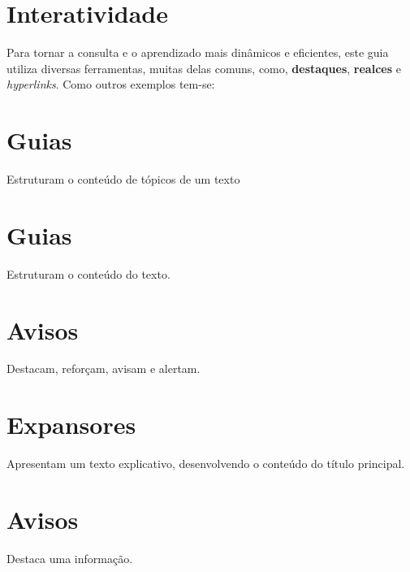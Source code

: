\documentclass[
  letterpaper,
  DIV=11,
  numbers=noendperiod]{scrreprt}
\begin{document}
\hypertarget{interatividade}{%
\section{Interatividade}\label{interatividade}}

Para tornar a consulta e o aprendizado mais dinâmicos e eficientes, este
guia utiliza diversas ferramentas, muitas delas comuns, como,
\textbf{destaques}, {\textbf{realces}} e \emph{hyperlinks}. Como outros
exemplos tem-se:

\hypertarget{guias}{%
\section{Guias}\label{guias}}

Estruturam o conteúdo de tópicos de um texto

\section{Guias}

Estruturam o conteúdo do texto.

\section{Avisos}

Destacam, reforçam, avisam e alertam.

\section{Expansores}

Apresentam um texto explicativo, desenvolvendo o conteúdo do título
principal.

\hypertarget{avisos-1}{%
\section{Avisos}\label{avisos-1}}

\begin{tcolorbox}[enhanced jigsaw, title=\textcolor{quarto-callout-tip-color}{\faLightbulb}\hspace{0.5em}{Dica}, colback=white, opacitybacktitle=0.6, colframe=quarto-callout-tip-color-frame, toprule=.15mm, titlerule=0mm, arc=.35mm, toptitle=1mm, bottomrule=.15mm, breakable, left=2mm, opacityback=0, rightrule=.15mm, bottomtitle=1mm, colbacktitle=quarto-callout-tip-color!10!white, leftrule=.75mm, coltitle=black]

Destaca uma informação.

\end{tcolorbox}
\end{document}
